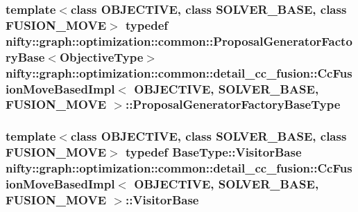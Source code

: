 \subsubsection[{Proposal\+Generator\+Factory\+Base\+Type}]{\setlength{\rightskip}{0pt plus 5cm}template$<$class O\+B\+J\+E\+C\+T\+I\+V\+E, class S\+O\+L\+V\+E\+R\+\_\+\+B\+A\+S\+E, class F\+U\+S\+I\+O\+N\+\_\+\+M\+O\+V\+E$>$ typedef {\bf nifty\+::graph\+::optimization\+::common\+::\+Proposal\+Generator\+Factory\+Base}$<${\bf Objective\+Type}$>$ {\bf nifty\+::graph\+::optimization\+::common\+::detail\+\_\+cc\+\_\+fusion\+::\+Cc\+Fusion\+Move\+Based\+Impl}$<$ O\+B\+J\+E\+C\+T\+I\+V\+E, S\+O\+L\+V\+E\+R\+\_\+\+B\+A\+S\+E, F\+U\+S\+I\+O\+N\+\_\+\+M\+O\+V\+E $>$\+::{\bf Proposal\+Generator\+Factory\+Base\+Type}}\label{classnifty_1_1graph_1_1optimization_1_1common_1_1detail__cc__fusion_1_1CcFusionMoveBasedImpl_a947607cc31008070837e3889069f9f94}
\hypertarget{classnifty_1_1graph_1_1optimization_1_1common_1_1detail__cc__fusion_1_1CcFusionMoveBasedImpl_abfd1605ff658ab8ad535ce8a87fc20e6}{}
\subsubsection[{Visitor\+Base}]{\setlength{\rightskip}{0pt plus 5cm}template$<$class O\+B\+J\+E\+C\+T\+I\+V\+E, class S\+O\+L\+V\+E\+R\+\_\+\+B\+A\+S\+E, class F\+U\+S\+I\+O\+N\+\_\+\+M\+O\+V\+E$>$ typedef Base\+Type\+::\+Visitor\+Base {\bf nifty\+::graph\+::optimization\+::common\+::detail\+\_\+cc\+\_\+fusion\+::\+Cc\+Fusion\+Move\+Based\+Impl}$<$ O\+B\+J\+E\+C\+T\+I\+V\+E, S\+O\+L\+V\+E\+R\+\_\+\+B\+A\+S\+E, F\+U\+S\+I\+O\+N\+\_\+\+M\+O\+V\+E $>$\+::{\bf Visitor\+Base}}\label{classnifty_1_1graph_1_1optimization_1_1common_1_1detail__cc__fusion_1_1CcFusionMoveBasedImpl_abfd1605ff658ab8ad535ce8a87fc20e6}
\hypertarget{classnifty_1_1graph_1_1optimization_1_1common_1_1detail__cc__fusion_1_1CcFusionMoveBasedImpl_a65874a0dbbea397a1323b93a0f327a40}{}
